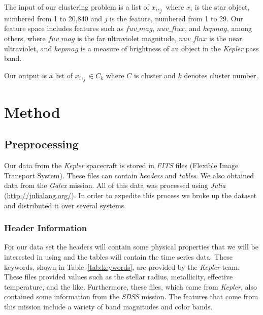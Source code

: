 \documentclass[12pt]{article}
\begin{document}

The input of our clustering problem is a list of $x_i,_j$ where $x_i$ is the star object, numbered from 1 to 20,840 and $j$ is the feature, numbered from 1 to 29.
Our feature space includes features such as $fuv\_mag$, $nuv\_flux$, and $kepmag$, among others, where $fuv\_mag$ is the far ultraviolet magnitude, $nuv\_flux$ is the near ultraviolet, and $kepmag$ is a measure of brightness of an object in the \textit{Kepler} pass band.

Our output is a list of $x_i,_j \in C_k$ where $C$ is cluster and $k$ denotes cluster number. 



\section{Method} %
\label{sec:Method}
\subsection{Preprocessing}
\label{sub:Preprocessing}
Our data from the \textit{Kepler} spacecraft is stored in \textit{FITS} files (Flexible Image Transport System).
These files can contain \emph{headers} and \emph{tables}.
We also obtained data from the \textit{Galex} mission.
All of this data was processed using \emph{Julia} (\url{http://julialang.org/}).
In order to expedite this process we broke up the dataset and distributed it over several systems.

\subsubsection{Header Information}
\label{ssub:Header Information}
For our data set the headers will contain some physical properties that we will be interested in using and the tables will contain the time series data.
These keywords, shown in Table~\ref{tab:keywords}, are provided by the \textit{Kepler} team.
These files provided values such as the stellar radius, metallicity, effective temperature, and the like.
Furthermore, these files, which came from \textit{Kepler}, also contained some information from the \textit{SDSS} mission.
The features that come from this mission include a variety of band magnitudes and color bands.
\end{document}
